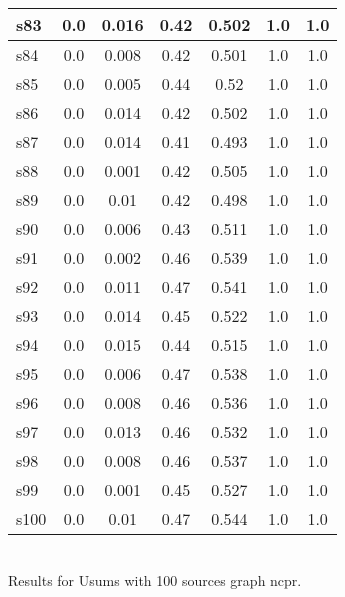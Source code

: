 \documentclass{article}
\begin{document}
\begin{tabular}{|l|c|c|c|c|c|c|}
s83 &0.0 & 0.016 & 0.42 & 0.502 & 1.0 & 1.0\\
\hline
s84 &0.0 & 0.008 & 0.42 & 0.501 & 1.0 & 1.0\\
\hline
s85 &0.0 & 0.005 & 0.44 & 0.52 & 1.0 & 1.0\\
\hline
s86 &0.0 & 0.014 & 0.42 & 0.502 & 1.0 & 1.0\\
\hline
s87 &0.0 & 0.014 & 0.41 & 0.493 & 1.0 & 1.0\\
\hline
s88 &0.0 & 0.001 & 0.42 & 0.505 & 1.0 & 1.0\\
\hline
s89 &0.0 & 0.01 & 0.42 & 0.498 & 1.0 & 1.0\\
\hline
s90 &0.0 & 0.006 & 0.43 & 0.511 & 1.0 & 1.0\\
\hline
s91 &0.0 & 0.002 & 0.46 & 0.539 & 1.0 & 1.0\\
\hline
s92 &0.0 & 0.011 & 0.47 & 0.541 & 1.0 & 1.0\\
\hline
s93 &0.0 & 0.014 & 0.45 & 0.522 & 1.0 & 1.0\\
\hline
s94 &0.0 & 0.015 & 0.44 & 0.515 & 1.0 & 1.0\\
\hline
s95 &0.0 & 0.006 & 0.47 & 0.538 & 1.0 & 1.0\\
\hline
s96 &0.0 & 0.008 & 0.46 & 0.536 & 1.0 & 1.0\\
\hline
s97 &0.0 & 0.013 & 0.46 & 0.532 & 1.0 & 1.0\\
\hline
s98 &0.0 & 0.008 & 0.46 & 0.537 & 1.0 & 1.0\\
\hline
s99 &0.0 & 0.001 & 0.45 & 0.527 & 1.0 & 1.0\\
\hline
s100 &0.0 & 0.01 & 0.47 & 0.544 & 1.0 & 1.0\\
\hline
\end{tabular}\\

\noindent Results for Usums with 100 sources graph ncpr.
\end{document}

